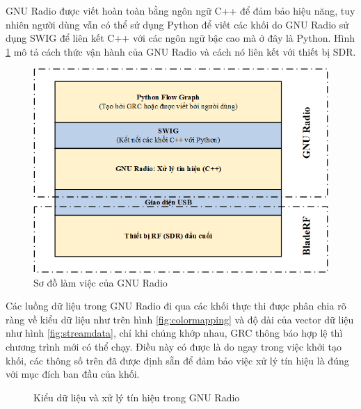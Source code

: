 GNU Radio được viết hoàn toàn bằng ngôn ngữ C++ để đảm bảo hiệu năng, tuy nhiên người dùng vẫn có thể sử dụng Python để viết các khối do GNU Radio sử dụng SWIG để liên kết C++ với các ngôn ngữ bậc cao mà ở đây là Python. Hình \ref{fig:SWIG} mô tả cách thức vận hành của GNU Radio và cách nó liên kết với thiết bị SDR.

\begin{figure} [!htb]
	\centering
	\includegraphics[width=0.9\linewidth]{figures/SWIG.png}
	\caption{Sơ đồ làm việc của GNU Radio}
	\label{fig:SWIG}
\end{figure}

Các luồng dữ liệu trong GNU Radio đi qua các khối thực thi được phân chia rõ ràng về kiểu dữ liệu như trên hình \ref{fig:colormapping} và độ dài của vector dữ liệu như hình \ref{fig:streamdata}, chỉ khi chúng khớp nhau, GRC thông báo hợp lệ thì chương trình mới có thể chạy. Điều này có được là do ngay trong việc khởi tạo khối, các thông số trên đã được định sẵn để đảm bảo việc xử lý tín hiệu là đúng với mục đích ban đầu của khối.

\begin{figure}[!h]
\centering
{}
\hfill
{}
\hfill
\caption{Kiểu dữ liệu và xử lý tín hiệu trong GNU Radio}
\end{figure}

